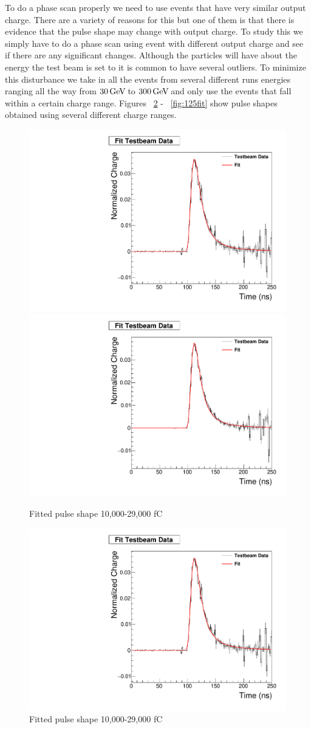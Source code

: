 To do a phase scan properly we need to use events that have very similar output charge. There are a variety of reasons for this but one of them is that there is evidence that the pulse shape may change with output charge. To study this we simply have to do a phase scan using event with different output charge and see if there are any significant changes. Although the particles will have about the energy the test beam is set to it is common to have several outliers. To minimize this disturbance we take in all the events from several different runs energies ranging all the way from $30{\,\text{Ge\hspace{-.08em}V\hspace{-0.16em}}}$ to $300{\,\text{Ge\hspace{-.08em}V\hspace{-0.16em}}}$ and only use the events that fall within a certain charge range. Figures ~\ref{fig:10fit} - ~\ref{fig:125fit} show pulse shapes obtained using several different charge ranges.

\begin{figure}
\centering
\includegraphics[width=0.495\linewidth]{Figures/FittedPlot.pdf}
\includegraphics[width=0.495\linewidth]{Figures/29FittedPlot.pdf}
\caption{Fitted pulse shape 10,000-29,000 fC}
\label{fig:10fit_together}
\end{figure}



\begin{figure}
\centering
\includegraphics[width=0.5\linewidth]{Figures/FittedPlot.pdf}
\caption{Fitted pulse shape 10,000-29,000 fC}
\label{fig:10fit}
\end{figure}

